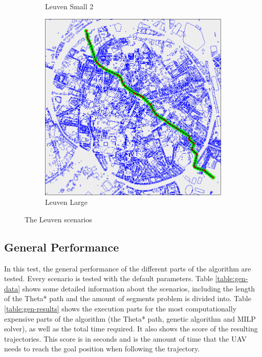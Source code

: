 \begin{figure}
\begin{subfigure}[t]{0.46\textwidth}
        		\caption{Leuven Small 2}
        		\label{fig:leuven-small-2}
	\end{subfigure}	
	\par
	\begin{subfigure}[t]{0.8\textwidth}
        		\includegraphics[width=\textwidth]{img/leuven-large}
        		\caption{Leuven Large}
        		\label{fig:leuven-large}
	\end{subfigure}
        
    \caption{The Leuven scenarios}\label{fig:sf-scens}
\end{figure}
\clearpage
\subsection{General Performance}
In this test, the general performance of the different parts of the algorithm are tested. Every scenario is tested with the default parameters. Table \ref{table:gen-data} shows some detailed information about the scenarios, including the length of the Theta* path and the amount of segments problem is divided into. Table \ref{table:gen-results} shows the execution parts for the most computationally expensive parts of the algorithm (the Theta* path, genetic algorithm and MILP solver), as well as the total time required. It also shows the score of the resulting trajectories. This score is in seconds and is the amount of time that the UAV needs to reach the goal position when following the trajectory. 


